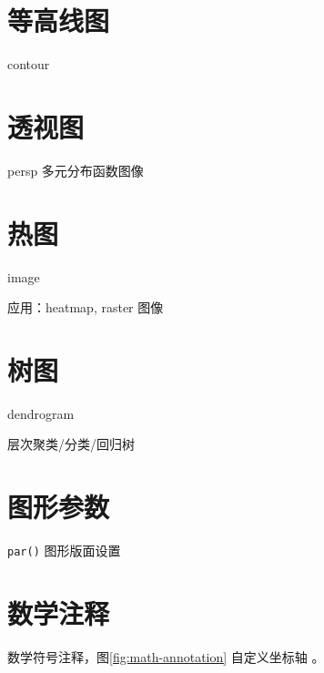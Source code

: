 \documentclass[a4paper,oneside,UTF8]{book}
\begin{document}
\hypertarget{contour-lines}{%
\section{等高线图}\label{contour-lines}}

contour

\hypertarget{perspective-plots}{%
\section{透视图}\label{perspective-plots}}

persp 多元分布函数图像

\hypertarget{images}{%
\section{热图}\label{images}}

image

应用：heatmap, raster 图像

\hypertarget{dendrogram}{%
\section{树图}\label{dendrogram}}

dendrogram

层次聚类/分类/回归树

\hypertarget{graphical-parameters}{%
\section{图形参数}\label{graphical-parameters}}

\texttt{par()} 图形版面设置

\hypertarget{math-annotation}{%
\section{数学注释}\label{math-annotation}}

数学符号注释，图\ref{fig:math-annotation} 自定义坐标轴 \citep{Paul2000}。
\end{document}
